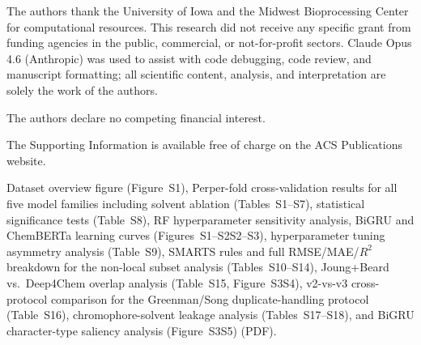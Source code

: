 \documentclass[journal=jcisd8,manuscript=article]{achemso}
\newcommand{\added}[1]{{\color{addedblue}#1}}
\newcommand{\removed}[1]{{\color{removedred}#1}}
\begin{document}
\begin{acknowledgement}
The authors thank the University of Iowa and the Midwest Bioprocessing Center for computational resources.
This research did not receive any specific grant from funding agencies in the public, commercial, or not-for-profit sectors.
Claude Opus 4.6 (Anthropic) was used to assist with code debugging, code review, and manuscript formatting; all scientific content, analysis, and interpretation are solely the work of the authors.
\end{acknowledgement}

The authors declare no competing financial interest.

\begin{suppinfo}
The Supporting Information is available free of charge on the ACS Publications website.

\added{Dataset overview figure (Figure~S1),} \removed{Per}\added{per}-fold cross-validation results for all five model families including solvent ablation (Tables~S1--S7), statistical significance tests (Table~S8), RF hyperparameter sensitivity analysis, BiGRU and ChemBERTa learning curves (Figures~\removed{S1--S2}\added{S2--S3}), hyperparameter tuning asymmetry analysis (Table~S9), \added{SMARTS rules and full RMSE/MAE/$R^2$ breakdown for the non-local subset analysis (Tables~S10--S14),} \added{Joung+Beard vs.\ Deep4Chem overlap analysis (Table~S15, Figure~\removed{S3}\added{S4}),} \added{v2-vs-v3 cross-protocol comparison for the Greenman/Song duplicate-handling protocol (Table~S16),} \added{chromophore-solvent leakage analysis (Tables~S17--S18),} and BiGRU character-type saliency analysis (Figure~\removed{S3}\added{S5}) (PDF).
\end{suppinfo}


\end{document}
